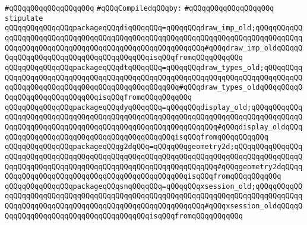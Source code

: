 \verb|#qQQqqQQqqQQqqQQqqQQq|\newline
\newline
\verb|#qQQqCompiledqQQqby:|\newline
\verb|#qQQqqQQqqQQqqQQqqQQq|\newline
\newline
\newline
\verb|stipulate|\newline
\verb|qQQqqQQqqQQqqQQqpackageqQQqdiqQQqqQQq=qQQqqQQqdraw_imp_old;qQQqqQQqqQQqqQQqqQQqqQQqqQQqqQQqqQQqqQQqqQQqqQQqqQQqqQQqqQQqqQQqqQQqqQQqqQQqqQQqqQQqqQQqqQQqqQQqqQQqqQQqqQQqqQQqqQQqqQQqqQQqqQQq#qQQqdraw_imp_oldqQQqqQQqqQQqqQQqqQQqqQQqqQQqqQQqqQQqqQQqisqQQqfromqQQqqQQqqQQq|\newline
\verb|qQQqqQQqqQQqqQQqpackageqQQqdtqQQqqQQq=qQQqqQQqdraw_types_old;qQQqqQQqqQQqqQQqqQQqqQQqqQQqqQQqqQQqqQQqqQQqqQQqqQQqqQQqqQQqqQQqqQQqqQQqqQQqqQQqqQQqqQQqqQQqqQQqqQQqqQQqqQQqqQQqqQQqqQQq#qQQqdraw_types_oldqQQqqQQqqQQqqQQqqQQqqQQqqQQqqQQqisqQQqfromqQQqqQQqqQQq|\newline
\verb|qQQqqQQqqQQqqQQqpackageqQQqdyqQQqqQQq=qQQqqQQqdisplay_old;qQQqqQQqqQQqqQQqqQQqqQQqqQQqqQQqqQQqqQQqqQQqqQQqqQQqqQQqqQQqqQQqqQQqqQQqqQQqqQQqqQQqqQQqqQQqqQQqqQQqqQQqqQQqqQQqqQQqqQQqqQQqqQQqqQQq#qQQqdisplay_oldqQQqqQQqqQQqqQQqqQQqqQQqqQQqqQQqqQQqqQQqqQQqisqQQqfromqQQqqQQqqQQq|\newline
\verb|qQQqqQQqqQQqqQQqpackageqQQqg2dqQQq=qQQqqQQqgeometry2d;qQQqqQQqqQQqqQQqqQQqqQQqqQQqqQQqqQQqqQQqqQQqqQQqqQQqqQQqqQQqqQQqqQQqqQQqqQQqqQQqqQQqqQQqqQQqqQQqqQQqqQQqqQQqqQQqqQQqqQQqqQQqqQQqqQQqqQQq#qQQqgeometry2dqQQqqQQqqQQqqQQqqQQqqQQqqQQqqQQqqQQqqQQqqQQqqQQqisqQQqfromqQQqqQQqqQQq|\newline
\verb|qQQqqQQqqQQqqQQqpackageqQQqsnqQQqqQQq=qQQqqQQqxsession_old;qQQqqQQqqQQqqQQqqQQqqQQqqQQqqQQqqQQqqQQqqQQqqQQqqQQqqQQqqQQqqQQqqQQqqQQqqQQqqQQqqQQqqQQqqQQqqQQqqQQqqQQqqQQqqQQqqQQqqQQqqQQqqQQq#qQQqxsession_oldqQQqqQQqqQQqqQQqqQQqqQQqqQQqqQQqqQQqqQQqisqQQqfromqQQqqQQqqQQq|\newline
